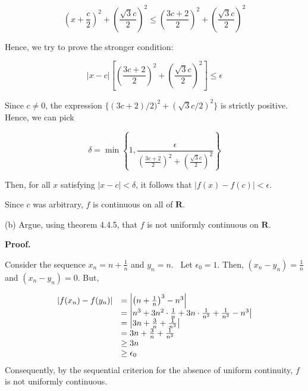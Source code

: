 \documentclass[10pt]{article}
\begin{document}
\begin{equation*}
\left( x+\frac{c}{2}\right)^{2} +\left(\frac{\sqrt{3} c}{2}\right)^{2} \leq \left(\frac{3c+2}{2}\right)^{2} +\left(\frac{\sqrt{3} c}{2}\right)^{2}
\end{equation*}


Hence, we try to prove the stronger condition:


\begin{equation*}
|x-c|\left[\left(\frac{3c+2}{2}\right)^{2} +\left(\frac{\sqrt{3} c}{2}\right)^{2}\right] \leq \epsilon 
\end{equation*}


Since $\displaystyle c\neq 0$, the expression $\displaystyle \{( 3c+2) /2)^{2} +\left(\sqrt{3} c/2\right)^{2}\}$ is strictly positive. Hence, we can pick 


\begin{equation*}
\delta =\min\left\{1,\frac{\epsilon }{\left(\frac{3c+2}{2}\right)^{2} +\left(\frac{\sqrt{3} c}{2}\right)^{2}}\right\}
\end{equation*}


Then, for all $\displaystyle x$ satisfying $\displaystyle |x-c|< \delta $, it follows that $\displaystyle |f( x) -f( c) |< \epsilon $.



Since $\displaystyle c$ was arbitrary, $\displaystyle f$ is continuous on all of $\displaystyle \mathbf{R}$.



(b) Argue, using theorem 4.4.5, that $\displaystyle f$ is not uniformly continuous on $\displaystyle \mathbf{R}$.



\textbf{Proof.}

Consider the sequence $\displaystyle x_{n} =n+\frac{1}{n}$ and $\displaystyle y_{n} =n$. \ Let $\displaystyle \epsilon _{0} =1$. Then, $\displaystyle ( x_{n} -y_{n}) =\frac{1}{n}$ and $\displaystyle ( x_{n} -y_{n}) =0$. But, 


\begin{equation*}
\begin{array}{ c l }
|f( x_{n}) -f( y_{n}) | & =\left| \left( n+\frac{1}{n}\right)^{3} -n^{3}\right| \\
 & =\left| n^{3} +3n^{2} \cdot \frac{1}{n} +3n\cdot \frac{1}{n^{2}} +\frac{1}{n^{3}} -n^{3}\right| \\
 & =\left| 3n+\frac{3}{n} +\frac{1}{n^{3}}\right| \\
 & =3n+\frac{3}{n} +\frac{1}{n^{3}}\\
 & \geq 3n\\
 & \geq \epsilon _{0}
\end{array}
\end{equation*}
Consequently, by the sequential criterion for the absence of uniform continuity, $\displaystyle f$ is not uniformly continuous.
\end{document}
